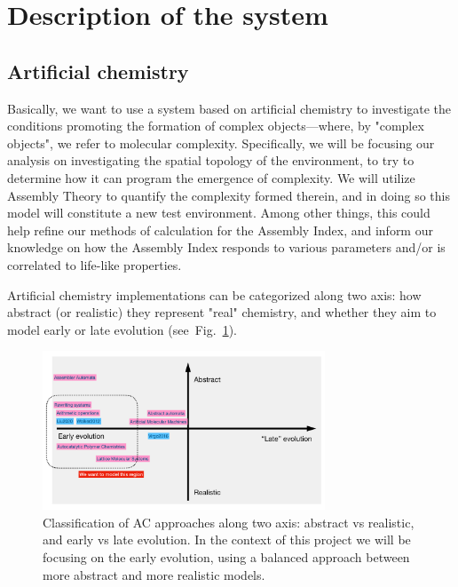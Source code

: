 \documentclass[11pt]{article}
\begin{document}
\tableofcontents
\clearpage

\section{Description of the system}

\subsection{Artificial chemistry}

Basically, we want to use a system based on artificial chemistry to investigate the conditions promoting the formation of complex objects---where, by "complex objects", we refer to molecular complexity. Specifically, we will be focusing our analysis on investigating the spatial topology of the environment, to try to determine how it can program the emergence of complexity. We will utilize Assembly Theory to quantify the complexity formed therein, and in doing so this model will constitute a new test environment. Among other things, this could help refine our methods of calculation for the Assembly Index, and inform our knowledge on how the Assembly Index responds to various parameters and/or is correlated to life-like properties.

Artificial chemistry implementations can be categorized along two axis: how abstract (or realistic) they represent "real" chemistry, and whether they aim to model early or late evolution (see~Fig.~\ref{fig:abstraction-stage}).

\begin{figure}[h]
  \centering
  \includegraphics[width=0.75\textwidth]{figures/system/abstraction-stage.pdf}
  \caption{Classification of AC approaches along two axis: abstract vs realistic, and early vs late evolution. In the context of this project we will be focusing on the early evolution, using a balanced approach between more abstract and more realistic models.}
  \label{fig:abstraction-stage}
\end{figure}
\end{document}
